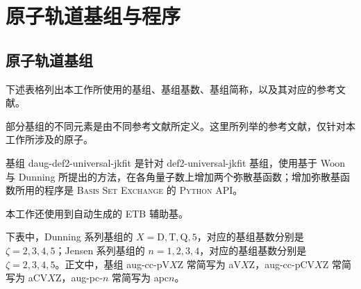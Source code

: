 
\chapter{原子轨道基组与程序}

\section{原子轨道基组}
\label{sec.A.basis-set}

下述表格列出本工作所使用的基组、基组基数、基组简称，以及其对应的参考文献。

部分基组的不同元素是由不同参考文献所定义。这里所列举的参考文献，仅针对本工作所涉及的原子。

基组 daug-def2-universal-jkfit 是针对 def2-universal-jkfit 基组，使用基于 Woon 与 Dunning 所提出的方法\cite{Woon-Dunning.JCP.1994}，在各角量子数上增加两个弥散基函数；增加弥散基函数所用的程序是 \textsc{Basis Set Exchange} 的 \textsc{Python} API。

本工作还使用到自动生成的 ETB 辅助基\cite{Stoychev-Neese.JCTC.2017}。

下表中，Dunning 系列基组的 $X = \mathrm{D, T, Q, 5}$，对应的基组基数分别是 $\zeta = 2, 3, 4, 5$；Jensen 系列基组的 $n = 1, 2, 3, 4$，对应的基组基数分别是 $\zeta = 2, 3, 4, 5$。正文中，基组 aug-cc-pV$X$Z 常简写为 aV$X$Z，aug-cc-pCV$X$Z 常简写为 aCV$X$Z，aug-pc-$n$ 常简写为 apc$n$。

\begingroup
\setlength{\LTleft}{-20cm plus -1fill}
\setlength{\LTright}{\LTleft}

